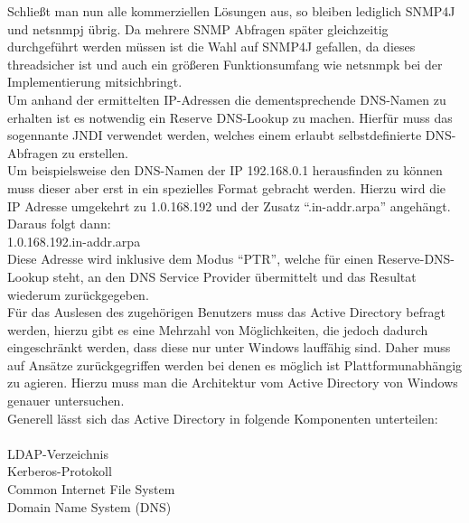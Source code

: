 Schließt man nun alle kommerziellen Lösungen aus, so bleiben lediglich SNMP4J und netsnmpj übrig.
Da mehrere SNMP Abfragen später gleichzeitig durchgeführt werden müssen ist die Wahl auf SNMP4J gefallen, da dieses threadsicher ist und auch ein größeren Funktionsumfang wie netsnmpk bei der Implementierung mitsichbringt.\\
Um anhand der ermittelten IP-Adressen die dementsprechende DNS-Namen zu erhalten ist es notwendig ein Reserve DNS-Lookup zu machen. Hierfür muss das sogennante JNDI verwendet werden, welches einem erlaubt selbstdefinierte DNS-Abfragen zu erstellen.\\
Um beispielsweise den DNS-Namen der IP 192.168.0.1 herausfinden zu können muss dieser aber erst in ein spezielles Format gebracht werden. Hierzu wird die IP Adresse umgekehrt zu 1.0.168.192 und der Zusatz “.in-addr.arpa” angehängt. Daraus folgt dann:\\

1.0.168.192.in-addr.arpa\\

Diese Adresse wird inklusive dem Modus “PTR”, welche für einen Reserve-DNS-Lookup steht, an den DNS Service Provider übermittelt und das Resultat wiederum zurückgegeben.\\

Für das Auslesen des zugehörigen Benutzers muss das Active Directory befragt werden, hierzu gibt es eine Mehrzahl von Möglichkeiten, die jedoch dadurch eingeschränkt werden, dass diese nur unter Windows lauffähig sind. Daher muss auf Ansätze zurückgegriffen werden bei denen es möglich ist Plattformunabhängig zu agieren. Hierzu muss man die Architektur vom Active Directory von Windows genauer untersuchen.\\
Generell lässt sich das Active Directory in folgende Komponenten unterteilen:\\
\\
LDAP-Verzeichnis\\
Kerberos-Protokoll\\
Common Internet File System\\
Domain Name System (DNS)\\


